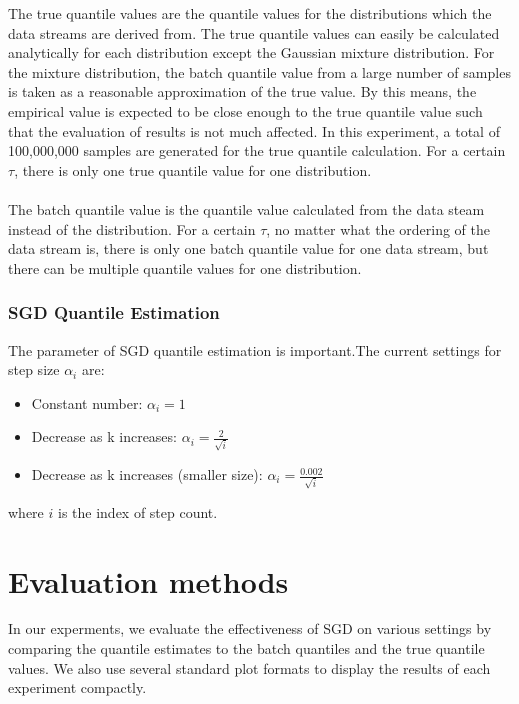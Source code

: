 The true quantile values are the quantile values for the distributions which the data streams are derived from. The true quantile values can easily be calculated analytically for each distribution except the Gaussian mixture distribution. For the mixture distribution, the batch quantile value from a large number of samples is taken as a reasonable approximation of the true value. By this means, the empirical value is expected to be close enough to the true quantile value such that the evaluation of results is not much affected. In this experiment, a total of 100,000,000 samples are generated for the true quantile calculation. For a certain $\tau$, there is only one true quantile value for one distribution.
\\\\
The batch quantile value is the quantile value calculated from the data steam instead of the distribution. For a certain $\tau$, no matter what the ordering of the data stream is, there is only one batch quantile value for one data stream, but there can be multiple quantile values for one distribution.

\subsubsection{SGD Quantile Estimation}

The parameter of SGD quantile estimation is important.The current settings for step size $\alpha_i$ are:
\begin{itemize}
    \item Constant number: $\alpha_i =1$
    \item Decrease as k increases: $\alpha_i= \frac{2}{\sqrt{i}}$
    \item Decrease as k increases (smaller size): $\alpha_i= \frac{0.002}{\sqrt{i}}$
\end{itemize}
where $i$ is the index of step count.

\section{Evaluation methods}
\label{sec: evaluation}
In our experments, we evaluate the effectiveness of SGD on various settings by comparing the quantile estimates to the batch quantiles and the true quantile values. We also use several standard plot formats to display the results of each experiment compactly. 

